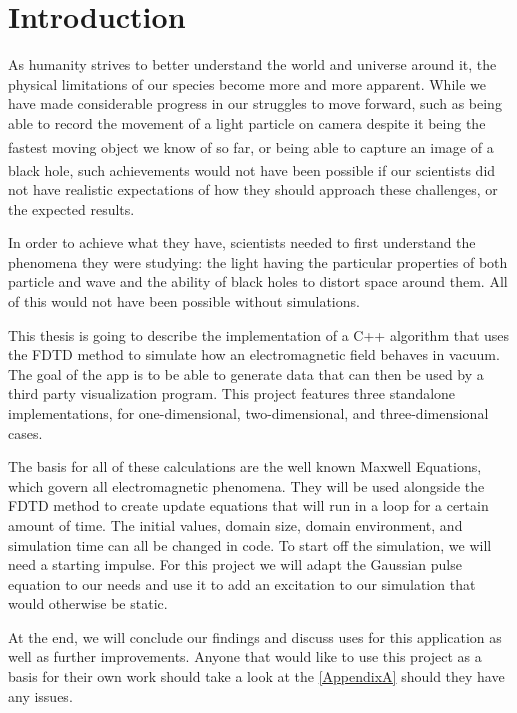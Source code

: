 
\chapter{Introduction} %

\label{Chapter1} %

As humanity strives to better understand the world and universe around it, the physical limitations of our species become more and more apparent. While we have made considerable progress in our struggles to move forward, such as being able to record the movement of a light particle on camera despite it being the fastest moving object we know of so far\textsuperscript{\cite{velten2013femto}}, or being able to capture an image of a black hole\textsuperscript{\cite{landau_2019}}, such achievements would not have been possible if our scientists did not have realistic expectations of how they should approach these challenges, or the expected results. 

In order to achieve what they have, scientists needed to first understand the phenomena they were studying: the light having the particular properties of both particle and wave and the ability of black holes to distort space around them. All of this would not have been possible without simulations. 

This thesis is going to describe the implementation of a C++ algorithm that uses the FDTD method to simulate how an electromagnetic field behaves in vacuum. The goal of the app is to be able to generate data that can then be used by a third party visualization program. This project features three standalone implementations, for one-dimensional, two-dimensional, and three-dimensional cases.

The basis for all of these calculations are the well known Maxwell Equations, which govern all electromagnetic phenomena. They will be used alongside the FDTD method to create update equations that will run in a loop for a certain amount of time. The initial values, domain size, domain environment, and simulation time can all be changed in code. To start off the simulation, we will need a starting impulse. For this project we will adapt the Gaussian pulse equation to our needs and use it to add an excitation to our simulation that would otherwise be static.

At the end, we will conclude our findings and discuss uses for this application as well as further improvements. Anyone that would like to use this project as a basis for their own work should take a look at the \ref{AppendixA} should they have any issues.

